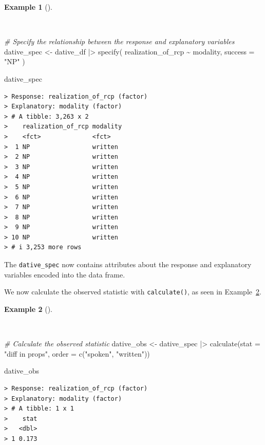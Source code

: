 \documentclass[
  letterpaper,
  DIV=11,
  numbers=noendperiod]{scrreprt}
\newenvironment{Shaded}{\begin{snugshade}}{\end{snugshade}}
\newcommand{\AttributeTok}[1]{\textcolor[rgb]{0.00,0.00,0.00}{#1}}
\newcommand{\CommentTok}[1]{\textcolor[rgb]{0.00,0.00,0.00}{\textit{#1}}}
\newcommand{\FunctionTok}[1]{\textcolor[rgb]{0.00,0.00,0.00}{#1}}
\newcommand{\NormalTok}[1]{\textcolor[rgb]{0.00,0.00,0.00}{#1}}
\newcommand{\OtherTok}[1]{\textcolor[rgb]{0.00,0.00,0.00}{#1}}
\newcommand{\SpecialCharTok}[1]{\textcolor[rgb]{0.00,0.00,0.00}{#1}}
\newcommand{\StringTok}[1]{\textcolor[rgb]{0.00,0.00,0.00}{#1}}
\theoremstyle{definition}
\newtheorem{example}{Example}[chapter]
\theoremstyle{remark}
\begin{document}
\begin{example}[]\protect\hypertarget{exm-ida-cat-specify-bivariate}{}\label{exm-ida-cat-specify-bivariate}

~

\begin{Shaded}
\begin{Highlighting}[]
\CommentTok{\# Specify the relationship between the response and explanatory variables}
\NormalTok{dative\_spec }\OtherTok{\textless{}{-}}
\NormalTok{  dative\_df }\SpecialCharTok{|\textgreater{}}
  \FunctionTok{specify}\NormalTok{(}
\NormalTok{    realization\_of\_rcp }\SpecialCharTok{\textasciitilde{}}\NormalTok{ modality,}
    \AttributeTok{success =} \StringTok{"NP"}
\NormalTok{  )}

\NormalTok{dative\_spec}
\end{Highlighting}
\end{Shaded}

\begin{verbatim}
> Response: realization_of_rcp (factor)
> Explanatory: modality (factor)
> # A tibble: 3,263 x 2
>    realization_of_rcp modality
>    <fct>              <fct>   
>  1 NP                 written 
>  2 NP                 written 
>  3 NP                 written 
>  4 NP                 written 
>  5 NP                 written 
>  6 NP                 written 
>  7 NP                 written 
>  8 NP                 written 
>  9 NP                 written 
> 10 NP                 written 
> # i 3,253 more rows
\end{verbatim}

\end{example}

The \texttt{dative\_spec} now contains attributes about the response and
explanatory variables encoded into the data frame.

We now calculate the observed statistic with \texttt{calculate()}, as
seen in Example~\ref{exm-ida-cat-calculate-bivariate}.

\begin{example}[]\protect\hypertarget{exm-ida-cat-calculate-bivariate}{}\label{exm-ida-cat-calculate-bivariate}

~

\begin{Shaded}
\begin{Highlighting}[]
\CommentTok{\# Calculate the observed statistic}
\NormalTok{dative\_obs }\OtherTok{\textless{}{-}}
\NormalTok{  dative\_spec }\SpecialCharTok{|\textgreater{}}
  \FunctionTok{calculate}\NormalTok{(}\AttributeTok{stat =} \StringTok{"diff in props"}\NormalTok{, }\AttributeTok{order =} \FunctionTok{c}\NormalTok{(}\StringTok{"spoken"}\NormalTok{, }\StringTok{"written"}\NormalTok{))}

\NormalTok{dative\_obs}
\end{Highlighting}
\end{Shaded}

\begin{verbatim}
> Response: realization_of_rcp (factor)
> Explanatory: modality (factor)
> # A tibble: 1 x 1
>    stat
>   <dbl>
> 1 0.173
\end{verbatim}

\end{example}
\end{document}
